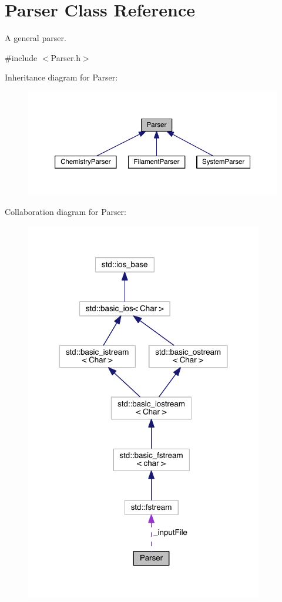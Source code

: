 \hypertarget{classParser}{\section{Parser Class Reference}
\label{classParser}
}


A general parser.  




{\ttfamily \#include $<$Parser.\+h$>$}



Inheritance diagram for Parser\+:
\nopagebreak
\begin{figure}[H]
\begin{center}
\leavevmode
\includegraphics[width=350pt]{classParser__inherit__graph}
\end{center}
\end{figure}


Collaboration diagram for Parser\+:\nopagebreak
\begin{figure}[H]
\begin{center}
\leavevmode
\includegraphics[width=294pt]{classParser__coll__graph}
\end{center}
\end{figure}
